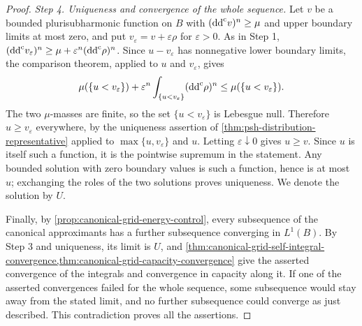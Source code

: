 \begin{proof}
\emph{Step 4. Uniqueness and convergence of the whole sequence.}
Let $v$ be a bounded plurisubharmonic function on $B$ with $(\mathrm{dd}^{\mathrm{c}} v)^n\geq\mu$ and upper boundary limits at most zero, and put $v_\varepsilon=v+\varepsilon\rho$ for $\varepsilon>0$. As in Step 1, $(\mathrm{dd}^{\mathrm{c}} v_\varepsilon)^n\geq\mu+\varepsilon^n(\mathrm{dd}^{\mathrm{c}}\rho)^n$. Since $u-v_\varepsilon$ has nonnegative lower boundary limits, the comparison theorem, applied to $u$ and $v_\varepsilon$, gives
\[
 \mu(\{u<v_\varepsilon\})
       +\varepsilon^n\int_{\{u<v_\varepsilon\}}(\mathrm{dd}^{\mathrm{c}}\rho)^n
          \leq\mu(\{u<v_\varepsilon\}).
\]
The two $\mu$-masses are finite, so the set $\{u<v_\varepsilon\}$ is Lebesgue null. Therefore $u\geq v_\varepsilon$ everywhere, by the uniqueness assertion of \cref{thm:psh-distribution-representative} applied to $\max\{u,v_\varepsilon\}$ and $u$. Letting $\varepsilon\downarrow0$ gives $u\geq v$. Since $u$ is itself such a function, it is the pointwise supremum in the statement. Any bounded solution with zero boundary values is such a function, hence is at most $u$; exchanging the roles of the two solutions proves uniqueness. We denote the solution by $U$.

Finally, by \cref{prop:canonical-grid-energy-control}, every subsequence of the canonical approximants has a further subsequence converging in $L^1(B)$. By Step 3 and uniqueness, its limit is $U$, and \cref{thm:canonical-grid-self-integral-convergence,thm:canonical-grid-capacity-convergence} give the asserted convergence of the integrals and convergence in capacity along it. If one of the asserted convergences failed for the whole sequence, some subsequence would stay away from the stated limit, and no further subsequence could converge as just described. This contradiction proves all the assertions.
\end{proof}

